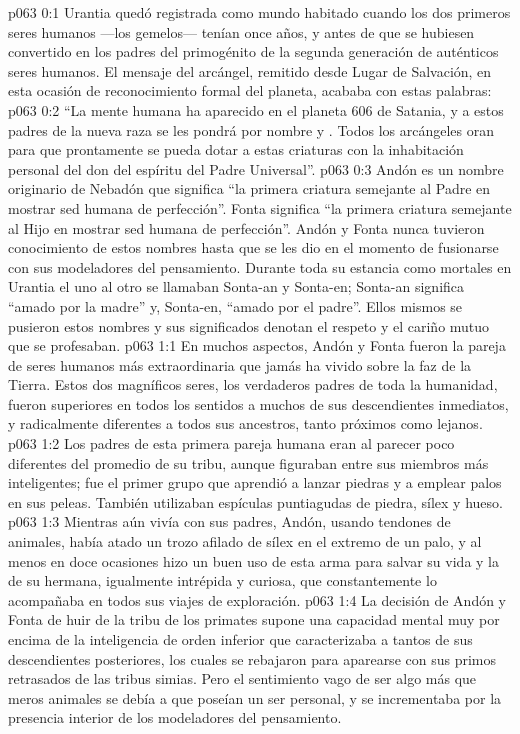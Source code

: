 \author{Portador de vida}
\vs p063 0:1 Urantia quedó registrada como mundo habitado cuando los dos primeros seres humanos ---los gemelos--- tenían once años, y antes de que se hubiesen convertido en los padres del primogénito de la segunda generación de auténticos seres humanos. El mensaje del arcángel, remitido desde Lugar de Salvación, en esta ocasión de reconocimiento formal del planeta, acababa con estas palabras:
\vs p063 0:2 “La mente humana ha aparecido en el planeta 606 de Satania, y a estos padres de la nueva raza se les pondrá por nombre  y . Todos los arcángeles oran para que prontamente se pueda dotar a estas criaturas con la inhabitación personal del don del espíritu del Padre Universal”.
\vs p063 0:3 \pc Andón es un nombre originario de Nebadón que significa “la primera criatura semejante al Padre en mostrar sed humana de perfección”. Fonta significa “la primera criatura semejante al Hijo en mostrar sed humana de perfección”. Andón y Fonta nunca tuvieron conocimiento de estos nombres hasta que se les dio en el momento de fusionarse con sus modeladores del pensamiento. Durante toda su estancia como mortales en Urantia el uno al otro se llamaban Sonta\hyp{}an y Sonta\hyp{}en; Sonta\hyp{}an significa “amado por la madre” y, Sonta\hyp{}en, “amado por el padre”. Ellos mismos se pusieron estos nombres y sus significados denotan el respeto y el cariño mutuo que se profesaban.
\vs p063 1:1 En muchos aspectos, Andón y Fonta fueron la pareja de seres humanos más extraordinaria que jamás ha vivido sobre la faz de la Tierra. Estos dos magníficos seres, los verdaderos padres de toda la humanidad, fueron superiores en todos los sentidos a muchos de sus descendientes inmediatos, y radicalmente diferentes a todos sus ancestros, tanto próximos como lejanos.
\vs p063 1:2 Los padres de esta primera pareja humana eran al parecer poco diferentes del promedio de su tribu, aunque figuraban entre sus miembros más inteligentes; fue el primer grupo que aprendió a lanzar piedras y a emplear palos en sus peleas. También utilizaban espículas puntiagudas de piedra, sílex y hueso.
\vs p063 1:3 Mientras aún vivía con sus padres, Andón, usando tendones de animales, había atado un trozo afilado de sílex en el extremo de un palo, y al menos en doce ocasiones hizo un buen uso de esta arma para salvar su vida y la de su hermana, igualmente intrépida y curiosa, que constantemente lo acompañaba en todos sus viajes de exploración.
\vs p063 1:4 La decisión de Andón y Fonta de huir de la tribu de los primates supone una capacidad mental muy por encima de la inteligencia de orden inferior que caracterizaba a tantos de sus descendientes posteriores, los cuales se rebajaron para aparearse con sus primos retrasados de las tribus simias. Pero el sentimiento vago de ser algo más que meros animales se debía a que poseían un ser personal, y se incrementaba por la presencia interior de los modeladores del pensamiento.
